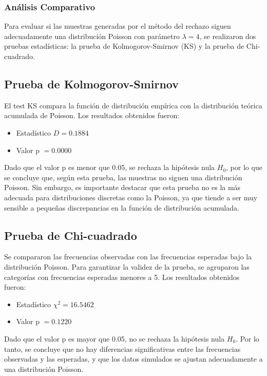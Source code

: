 \documentclass{article}
\begin{document}
\subsubsection{Análisis Comparativo}

Para evaluar si las muestras generadas por el método del rechazo siguen adecuadamente una distribución Poisson con parámetro \(\lambda = 4\), se realizaron dos pruebas estadísticas: la prueba de Kolmogorov-Smirnov (KS) y la prueba de Chi-cuadrado.

\subsection{Prueba de Kolmogorov-Smirnov}

El test KS compara la función de distribución empírica con la distribución teórica acumulada de Poisson. Los resultados obtenidos fueron:

\begin{itemize}
    \item Estadístico \(D = 0.1884\)
    \item Valor p \(= 0.0000\)
\end{itemize}

Dado que el valor p es menor que 0.05, se rechaza la hipótesis nula \(H_0\), por lo que se concluye que, según esta prueba, las muestras no siguen una distribución Poisson. Sin embargo, es importante destacar que esta prueba no es la más adecuada para distribuciones discretas como la Poisson, ya que tiende a ser muy sensible a pequeñas discrepancias en la función de distribución acumulada.

\subsection{Prueba de Chi-cuadrado}

Se compararon las frecuencias observadas con las frecuencias esperadas bajo la distribución Poisson. Para garantizar la validez de la prueba, se agruparon las categorías con frecuencias esperadas menores a 5. Los resultados obtenidos fueron:

\begin{itemize}
    \item Estadístico \(\chi^2 = 16.5462\)
    \item Valor p \(= 0.1220\)
\end{itemize}

Dado que el valor p es mayor que 0.05, no se rechaza la hipótesis nula \(H_0\). Por lo tanto, se concluye que no hay diferencias significativas entre las frecuencias observadas y las esperadas, y que los datos simulados se ajustan adecuadamente a una distribución Poisson.
\end{document}
